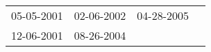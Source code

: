 \begin{supertabular}{llll}
 05-05-2001 &  02-06-2002 &  04-28-2005 \\
 12-06-2001 &  08-26-2004 &             \\
\end{supertabular}
